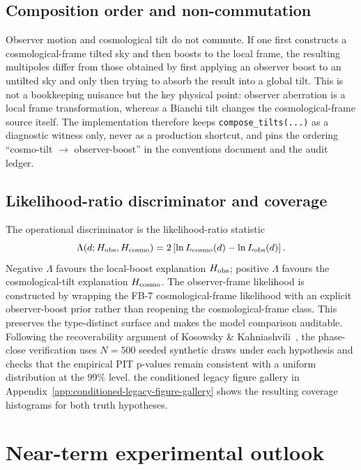 \subsection{Composition order and non-commutation}

Observer motion and cosmological tilt do not commute.  If one
first constructs a cosmological-frame tilted sky and then boosts
to the local frame, the resulting multipoles differ from those
obtained by first applying an observer boost to an untilted sky
and only then trying to absorb the result into a global tilt.
This is not a bookkeeping nuisance but the key physical point:
observer aberration is a local frame transformation, whereas a
Bianchi tilt changes the cosmological-frame source itself.  The
implementation therefore keeps \texttt{compose\_tilts(...)} as a
diagnostic witness only, never as a production shortcut, and
pins the ordering
``cosmo-tilt $\rightarrow$ observer-boost'' in the conventions
document and the audit ledger.


\subsection{Likelihood-ratio discriminator and coverage}

The operational discriminator is the likelihood-ratio statistic
\begin{equation}
\Lambda(d; H_{\rm obs}, H_{\rm cosmo})
= 2\,[\ln L_{\rm cosmo}(d) - \ln L_{\rm obs}(d)]\,.
\end{equation}
Negative $\Lambda$ favours the local-boost explanation
$H_{\rm obs}$; positive $\Lambda$ favours the cosmological-tilt
explanation $H_{\rm cosmo}$.  The observer-frame likelihood is
constructed by wrapping the FB-7 cosmological-frame likelihood
with an explicit observer-boost prior rather than reopening the
cosmological-frame class.  This preserves the type-distinct
surface and makes the model comparison auditable.  Following the
recoverability argument of Kosowsky \&
Kahniashvili~\cite{KosowskyKahniashvili2011}, the phase-close
verification uses $N=500$ seeded synthetic draws under each
hypothesis and checks that the empirical PIT p-values remain
consistent with a uniform distribution at the $99\%$ level.
the conditioned legacy figure gallery in Appendix~\ref{app:conditioned-legacy-figure-gallery} shows the resulting
coverage histograms for both truth hypotheses.


\section{Near-term experimental outlook}
\label{sec:dipole-outlook}

